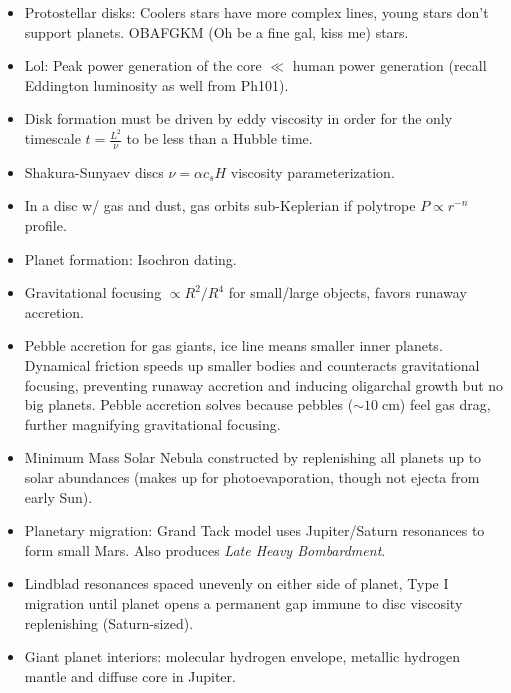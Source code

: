 \documentclass[11pt,
        usenames, %
        dvipsnames %
    ]{article}
\begin{document}
\begin{itemize}
    \item Protostellar disks: Coolers stars have more complex lines, young stars
        don't support planets. OBAFGKM (Oh be a fine gal, kiss me) stars.
    \item Lol: Peak power generation of the core $\ll$ human power generation
        (recall Eddington luminosity as well from Ph101).
    \item Disk formation must be driven by eddy viscosity in order for the only
        timescale $t = \frac{L^2}{\nu}$ to be less than a Hubble time.
    \item Shakura-Sunyaev discs $\nu = \alpha c_s H$ viscosity parameterization.
    \item In a disc w/ gas and dust, gas orbits sub-Keplerian if polytrope $P
        \propto r^{-n}$ profile.

    \item Planet formation: Isochron dating.
    \item Gravitational focusing $\propto R^2/R^4$ for small/large objects,
        favors runaway accretion.
    \item Pebble accretion for gas giants, ice line means smaller inner planets.
        Dynamical friction speeds up smaller bodies and counteracts
        gravitational focusing, preventing runaway accretion and inducing
        oligarchal growth but no big planets. Pebble accretion solves because
        pebbles ($\sim 10\;\mathrm{cm}$) feel gas drag, further magnifying
        gravitational focusing.
    \item Minimum Mass Solar Nebula constructed by replenishing all planets up
        to solar abundances (makes up for photoevaporation, though not ejecta
        from early Sun).

    \item Planetary migration: Grand Tack model uses Jupiter/Saturn resonances
        to form small Mars. Also produces \emph{Late Heavy Bombardment}.
    \item Lindblad resonances spaced unevenly on either side of planet, Type I
        migration until planet opens a permanent gap immune to disc viscosity
        replenishing (Saturn-sized).

    \item Giant planet interiors: molecular hydrogen envelope, metallic hydrogen
        mantle and diffuse core in Jupiter.
\end{itemize}
\end{document}
